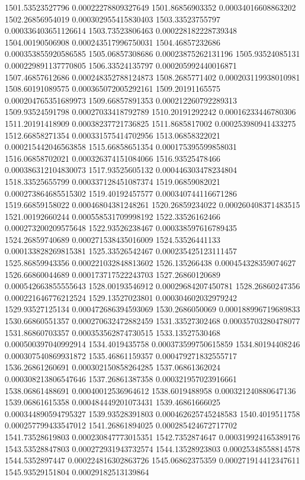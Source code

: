 {1501.53523527796 0.00022278809327649
1501.86856903352 0.00034016608863202
1502.26856954019 0.000302955415830403
1503.33523755797 0.000336403651126614
1503.73523806463 0.000228182228739348
1504.00190506908 0.000243517996750031
1504.46857232686 0.000353855920586585
1505.06857308686 0.00023875262131196
1505.93524085131 0.000229891137770805
1506.33524135797 0.000205992440016871
1507.46857612686 0.000248352788124873
1508.2685771402 0.000203119938010981
1508.60191089575 0.000365072005292161
1509.20191165575 0.000204765351689973
1509.66857891353 0.000212260792289313
1509.93524591798 0.00027033418792789
1510.20191292242 0.00016233446780306
1511.20191418909 0.00038237721736825
1511.8685817002 0.000253980941433275
1512.66858271354 0.000331575414702956
1513.06858322021 0.000215442046563858
1515.66858651354 0.000175395599858031
1516.06858702021 0.000326374151084066
1516.93525478466 0.000386312104830073
1517.93525605132 0.000446303478234804
1518.33525655799 0.000337128451087374
1519.06859082021 0.000273864685515302
1519.40192457577 0.000340744116671286
1519.66859158022 0.00046804381248261
1520.26859234022 0.000260408371483515
1521.00192660244 0.000558531709998192
1522.33526162466 0.000273200209575648
1522.93526238467 0.000338597616789435
1524.26859740689 0.000271538435016009
1524.53526441133 0.000133828269815381
1525.33526542467 0.000235425123111457
1525.86859943356 0.000221032848813602
1526.135266438 0.000454328359074627
1526.66860044689 0.000173717522243703
1527.26860120689 0.000542663855555643
1528.00193546912 0.00029684207450781
1528.26860247356 0.000221646776212524
1529.13527023801 0.000304602032979242
1529.93527125134 0.000472686394593069
1530.2686050069 0.000188996719689833
1530.66860551357 0.000270632472882459
1531.33527302468 0.00035703280478077
1531.86860703357 0.000353562874730515
1533.13527530468 0.000500397040992914
1534.4019435758 0.000373599750615859
1534.80194408246 0.000307540869931872
1535.46861159357 0.000479271832555717
1536.26861260691 0.000302150858264285
1537.06861362024 0.000308213806547646
1537.26861387358 0.000321957023916661
1538.06861488691 0.00040012536964612
1538.6019488958 0.000321240880647136
1539.06861615358 0.000484449201073431
1539.46861666025 0.000344890594795327
1539.93528391803 0.000462625745248583
1540.4019511758 0.000257799433547012
1541.26861894025 0.000285424672717702
1541.73528619803 0.000230847773015351
1542.7352874647 0.000319924165389176
1543.53528847803 0.000272931943732574
1544.13528923803 0.00025348558814578
1544.5352897447 0.000224816302863726
1545.06862375359 0.000271914412347611
1545.93529151804 0.00029182513139864
}

